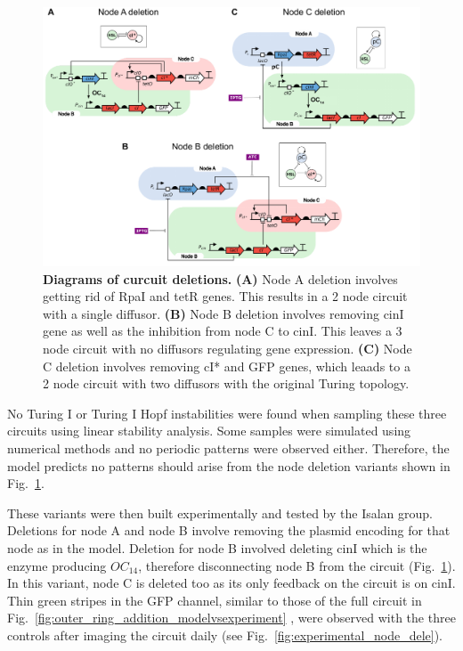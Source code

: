 \begin{figure}[H] %
    \centering
    \begin{adjustbox}{center}
        \includegraphics[width=1.1\textwidth]{chapters/Chapter 3/deletion_circuits} %
    \end{adjustbox}
    \caption{\textbf{Diagrams of curcuit deletions.} \textbf{(A)} Node A deletion involves getting rid of RpaI and tetR genes. This results in a 2 node circuit with a single diffusor. \textbf{(B)} Node B deletion involves removing cinI gene as well as the inhibition from node C to cinI. This leaves a 3 node circuit with no diffusors regulating gene expression. \textbf{(C)} Node C deletion involves removing cI* and GFP genes, which leaads to a 2 node circuit with two diffusors with the original Turing topology.}
    \label{fig:deletion_circuits}
\end{figure}

No Turing I or Turing I Hopf instabilities were found when sampling these three circuits using linear stability analysis.
Some samples were simulated using numerical methods and no periodic patterns were observed either.
Therefore, the model predicts no patterns should arise from the node deletion variants shown in Fig.~\ref{fig:deletion_circuits}.

These variants were then built experimentally and tested by the
Isalan group.
Deletions for node A and node B involve removing the plasmid encoding for that node as in the model.
Deletion for node B involved deleting cinI which is the enzyme producing $OC_{14}$, therefore disconnecting node B from the circuit (Fig.~\ref{fig:deletion_circuits}).
In this variant, node C is deleted too as its only feedback on the circuit is on cinI.
Thin green stripes in the GFP channel, similar to those of the full circuit in Fig.~\ref{fig:outer_ring_addition_modelvsexperiment} , were observed with the three controls after imaging the circuit daily (see Fig.~\ref{fig:experimental_node_dele}).


